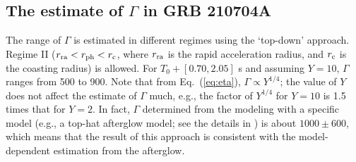 \documentclass[prd,twocolumn,amsmath,amssymb,aps,linenumbers]{revtex4-2} %
\begin{document}
\subsection{The estimate of $\Gamma$ in GRB 210704A}
The range of $\Gamma$ is estimated in different regimes using the `top-down' approach. Regime II ($r_{\rm ra}<r_{\rm ph}<r_{\rm c}$, where $r_{\rm ra}$ is the rapid acceleration radius, and $r_{\rm c}$ is the coasting radius) is allowed. For $T_0+[0.70, 2.05]$ s and assuming $Y=10$, $\Gamma$ ranges from 500 to 900. Note that from Eq.~(\ref{eq:eta}), $\Gamma\propto Y^{1/4}$; the value of $Y$ does not affect the estimate of $\Gamma$ much, e.g., the factor of $Y^{1/4}$ for $Y=10$ is 1.5 times that for $Y=2$. In fact, $\Gamma$ determined from the modeling with a specific model (e.g., a top-hat afterglow model; see the details in \citealt{2026MNRAS.548ag555P}) is about $1000 \pm 600$, which means that the result of this approach is consistent with the model-dependent estimation from the afterglow.








\end{document}
